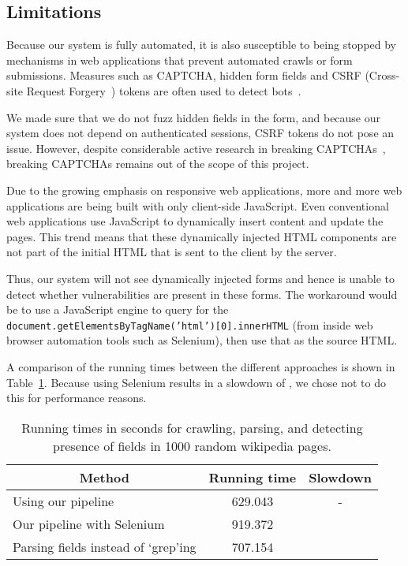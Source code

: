 \subsection[Limitations]{Limitations}
\label{limitations}
		Because our system is fully automated, it is also susceptible to being stopped by mechanisms in web applications that prevent automated crawls or form submissions. Measures such as CAPTCHA, hidden form fields and CSRF (Cross-site Request Forgery~\cite{csrf}) tokens are often used to detect bots~\cite{captchas3, captchas2}.

		We made sure that we do not fuzz hidden fields in the form, and because our system does not depend on authenticated sessions, CSRF tokens do not pose an issue. However, despite considerable active research in breaking CAPTCHAs~\cite{captchas2, captchas}, breaking CAPTCHAs remains out of the scope of this project. 
		
	   Due to the growing emphasis on responsive web applications, more and more web applications are being built with only client-side JavaScript. Even conventional web applications use JavaScript to dynamically insert content and update the pages. This trend means that these dynamically injected HTML components are not part of the initial HTML that is sent to the client by the server.

		Thus, our system will not see dynamically injected forms and hence is unable to detect whether \ehi vulnerabilities are present in these forms. The workaround would be to use a JavaScript engine to query for the \texttt{document.getElementsByTagName('html')[0].innerHTML} (from inside web browser automation tools such as Selenium), then use that as the source HTML. 
		
		A comparison of the running times between the different approaches is shown in Table~\ref{tab:perf}. Because using Selenium results in a slowdown of \slowSelenium, we chose not to do this for performance reasons. 
		
		\begin{table}
			\centering
			\scriptsize
			\begin{tabular}{|p{4cm}|c|c|}
				\hline
				\multicolumn{1}{|c}{\textbf{Method}} &
				\multicolumn{1}{|c|}{\textbf{Running time}} &
				\multicolumn{1}{|c|}{\textbf{Slowdown}}
				\\
				\hline
				\centering Using our pipeline & 629.043 & - \\
				\hline
				\centering Our pipeline with Selenium & 919.372 & \slowSelenium \\
				\hline				
				\centering Parsing \email fields instead of `grep'ing& 707.154 & \slowParse \\								
				\hline
			\end{tabular}
			\caption[\titlecap{}]{Running times in seconds for crawling, parsing, and detecting presence of \email fields in 1000 random wikipedia pages.}
            \vspace{-5ex}
			\label{tab:perf}
		\end{table}

